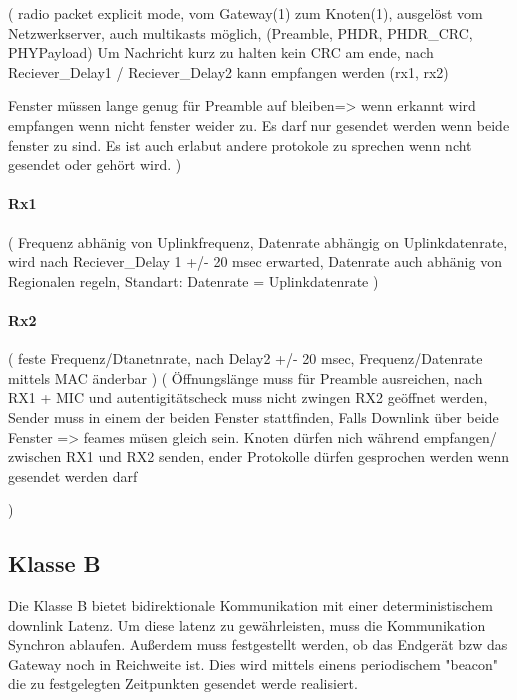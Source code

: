 \documentclass[a4paper,12pt]{article}
\begin{document}
                \cite{LoRaSpec}
                (
                    radio packet explicit mode, vom Gateway(1) zum Knoten(1), ausgelöst vom Netzwerkserver, auch multikasts möglich, (Preamble, PHDR, PHDR\_CRC, PHYPayload)
                Um Nachricht kurz zu halten kein CRC am ende, nach Reciever\_Delay1 / Reciever\_Delay2 kann empfangen werden (rx1, rx2) 
                
                Fenster müssen lange genug für Preamble auf bleiben=> wenn erkannt wird empfangen wenn nicht fenster weider zu. Es darf nur gesendet werden wenn beide fenster zu sind.
                Es ist auch erlabut andere protokole zu sprechen wenn ncht gesendet oder gehört wird.
                )
                \paragraph{Rx1}
                    \cite{LoRaSpec}(
                        Frequenz abhänig von Uplinkfrequenz, Datenrate abhängig on Uplinkdatenrate, wird nach Reciever\_Delay 1 +/- 20 msec erwarted, Datenrate auch abhänig von Regionalen regeln, Standart: Datenrate = Uplinkdatenrate
                    )
                \paragraph{Rx2}
                    \cite{LoRaSpec}(
                        feste Frequenz/Dtanetnrate, nach Delay2 +/- 20 msec, Frequenz/Datenrate mittels MAC änderbar
                    )
                    \cite{LoRaSpec}(
                        Öffnungslänge muss für Preamble ausreichen, nach RX1 + MIC und autentigitätscheck muss nicht zwingen RX2 geöffnet werden, Sender muss in einem der beiden Fenster stattfinden, Falls Downlink über beide Fenster => feames müsen gleich sein. Knoten dürfen nich während empfangen/ zwischen RX1 und RX2 senden, ender Protokolle dürfen gesprochen werden wenn gesendet werden darf

                        )
        \subsection{Klasse B}
            Die Klasse B bietet bidirektionale Kommunikation mit einer deterministischem downlink Latenz. Um diese latenz zu gewährleisten, muss die Kommunikation Synchron ablaufen. Außerdem muss festgestellt werden, ob das Endgerät bzw das Gateway noch in Reichweite ist. Dies wird mittels einens periodischem "beacon" die zu festgelegten
            Zeitpunkten gesendet werde realisiert.
\end{document}
